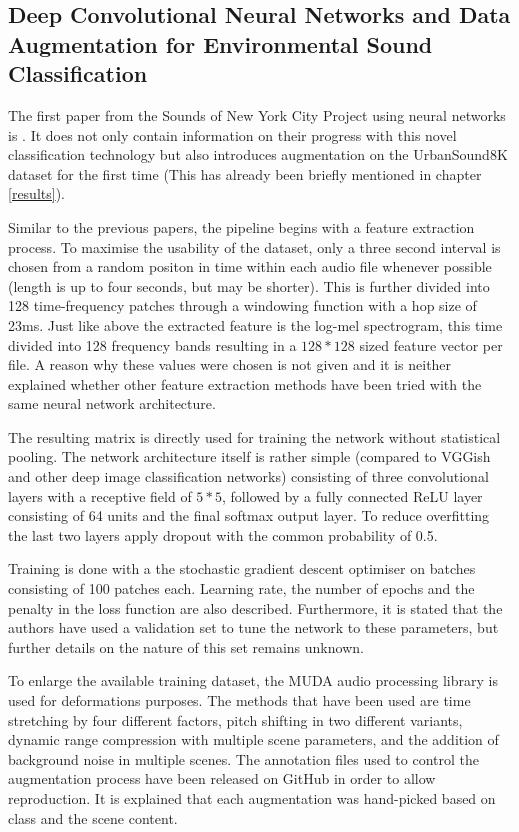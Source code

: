 \subsection{Deep Convolutional Neural Networks and Data
Augmentation for Environmental Sound
Classification}

The first paper from the Sounds of New York City Project using neural networks is \cite{DBLP:journals/corr/SalamonB16}. It does not only contain information on their progress with this novel classification technology but also introduces augmentation on the UrbanSound8K dataset for the first time (This has already been briefly mentioned in chapter \ref{results}).

Similar to the previous papers, the pipeline begins with a feature extraction process. To maximise the usability of the dataset, only a three second interval is chosen from a random positon in time within each audio file whenever possible (length is up to four seconds, but may be shorter). This is further divided into 128 time-frequency patches through a windowing function with a hop size of 23ms. Just like above the extracted feature is the log-mel spectrogram, this time divided into 128 frequency bands resulting in a $128*128$ sized feature vector per file. A reason why these values were chosen is not given and it is neither explained whether other feature extraction methods have been tried with the same neural network architecture.

The resulting matrix is directly used for training the network without statistical pooling. The network architecture itself is rather simple (compared to VGGish and other deep image classification networks) consisting of three convolutional layers with a receptive field of $5*5$, followed by a fully connected ReLU layer consisting of 64 units and the final softmax output layer. To reduce overfitting the last two layers apply dropout with the common probability of 0.5.

Training is done with a the stochastic gradient descent optimiser on batches consisting of 100 patches each. Learning rate, the number of epochs and the penalty in the loss function are also described. Furthermore, it is stated that the authors have used a validation set to tune the network to these parameters, but further details on the nature of this set remains unknown. 

To enlarge the available training dataset, the MUDA audio processing library is used for deformations purposes. The methods that have been used are time stretching by four different factors, pitch shifting in two different variants, dynamic range compression with multiple scene parameters, and the addition of background noise in multiple scenes. The annotation files used to control the augmentation process have been released on GitHub in order to allow reproduction. It is explained that each augmentation was hand-picked based on class and the scene content.

